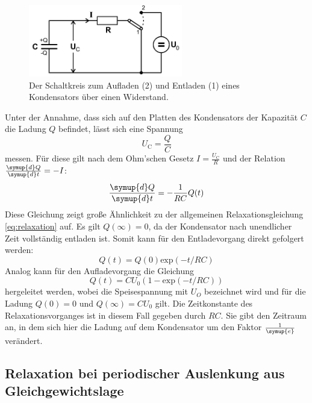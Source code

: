     \begin{figure}[H]
        \centering
        \includegraphics[width=0.6\textwidth]{bilder/Auflade_und_entlade.PNG}
        \caption{Der Schaltkreis zum Aufladen (2) und Entladen (1) eines Kondensators über einen Widerstand.\cite{anleitung}}
        \label{fig:Auf_Entladen}
    \end{figure}

    \noindent
    Unter der Annahme, dass sich auf den Platten des Kondensators der Kapazität $C$ die Ladung $Q$ befindet, lässt sich eine Spannung 
    \begin{equation*}
        U_{\text{C}} = \frac{Q}{C}
    \end{equation*}
    messen. Für diese gilt nach dem Ohm'schen Gesetz $I = \frac{U_{\text{C}}}{R}$ und der Relation $\frac{\symup{d}Q}{\symup{d}t} = -I$:
    \begin{equation*}
        \frac{\symup{d}Q}{\symup{d}t}  = - \frac{1}{RC} Q(t)
    \end{equation*}
    Diese Gleichung zeigt große Ähnlichkeit zu der allgemeinen Relaxationsgleichung \eqref{eq:relaxation} auf. Es gilt $Q(\infty) = 0$, da der Kondensator nach 
    unendlicher Zeit vollständig entladen ist. Somit kann für den Entladevorgang direkt gefolgert werden:
    \begin{equation*}
        Q(t) = Q(0) \text{exp}(-t/RC)
    \end{equation*}
    Analog kann für den Aufladevorgang die Gleichung
    \begin{equation*}
        Q(t) = CU_0(1- \text{exp}(-t/RC))
    \end{equation*}
    hergeleitet werden, wobei die Speisespannung mit $U_O$ bezeichnet wird und für die Ladung $Q(0)= 0 $ und $Q(\infty) = CU_0 $ gilt.
    Die Zeitkonstante des Relaxationsvorganges ist in diesem Fall gegeben durch $RC$. Sie gibt den Zeitraum an, in dem sich hier die Ladung auf dem Kondensator 
    um den Faktor $\frac{1}{\symup{e}}$ verändert.

\subsection{Relaxation bei periodischer Auslenkung aus Gleichgewichtslage}

